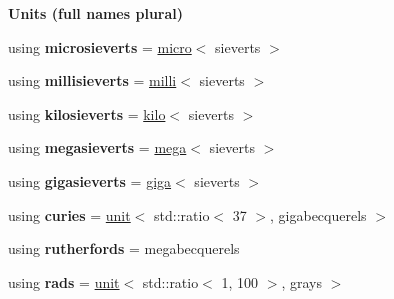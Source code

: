 \begin{Indent}{\bf Units (full names plural)}
\begin{DoxyCompactItemize}
\item 
\hypertarget{namespaceunits_1_1radiation_aecca513ccb60adfaa4dea4350ca12def}{}using {\bfseries microsieverts} = \hyperlink{group___unit_manipulators_gaea53c906ec805110b93f02db4a961971}{micro}$<$ sieverts $>$\label{namespaceunits_1_1radiation_aecca513ccb60adfaa4dea4350ca12def}

\item 
\hypertarget{namespaceunits_1_1radiation_ae30e65b90ce444104b353f2d8bd8f867}{}using {\bfseries millisieverts} = \hyperlink{group___unit_manipulators_gaec9d1c320e180eb59f3cb3094d8079dd}{milli}$<$ sieverts $>$\label{namespaceunits_1_1radiation_ae30e65b90ce444104b353f2d8bd8f867}

\item 
\hypertarget{namespaceunits_1_1radiation_afbf185dad50fe4e5b0a06f8d8c759661}{}using {\bfseries kilosieverts} = \hyperlink{group___unit_manipulators_ga89965a45aaa6689548b9c53858759c5e}{kilo}$<$ sieverts $>$\label{namespaceunits_1_1radiation_afbf185dad50fe4e5b0a06f8d8c759661}

\item 
\hypertarget{namespaceunits_1_1radiation_acf0748b9b92d3702263bc912c266351a}{}using {\bfseries megasieverts} = \hyperlink{group___unit_manipulators_gab1e685fcf4dd9478ed3d688f7af50842}{mega}$<$ sieverts $>$\label{namespaceunits_1_1radiation_acf0748b9b92d3702263bc912c266351a}

\item 
\hypertarget{namespaceunits_1_1radiation_a43f02e2f8eb4ae252c17b79fe2c9a3c4}{}using {\bfseries gigasieverts} = \hyperlink{group___unit_manipulators_ga4595911f659ef61133216da15d61eb07}{giga}$<$ sieverts $>$\label{namespaceunits_1_1radiation_a43f02e2f8eb4ae252c17b79fe2c9a3c4}

\item 
\hypertarget{namespaceunits_1_1radiation_a6ab65c5a7272da100ee050dfcac56cf5}{}using {\bfseries curies} = \hyperlink{structunits_1_1unit}{unit}$<$ std\+::ratio$<$ 37 $>$, gigabecquerels $>$\label{namespaceunits_1_1radiation_a6ab65c5a7272da100ee050dfcac56cf5}

\item 
\hypertarget{namespaceunits_1_1radiation_a242f41648f11e586ed67099a941f2f70}{}using {\bfseries rutherfords} = megabecquerels\label{namespaceunits_1_1radiation_a242f41648f11e586ed67099a941f2f70}

\item 
\hypertarget{namespaceunits_1_1radiation_a5d3da8c4e75fcd1e9a38c65c1e527800}{}using {\bfseries rads} = \hyperlink{structunits_1_1unit}{unit}$<$ std\+::ratio$<$ 1, 100 $>$, grays $>$\label{namespaceunits_1_1radiation_a5d3da8c4e75fcd1e9a38c65c1e527800}

\end{DoxyCompactItemize}
\end{Indent}
